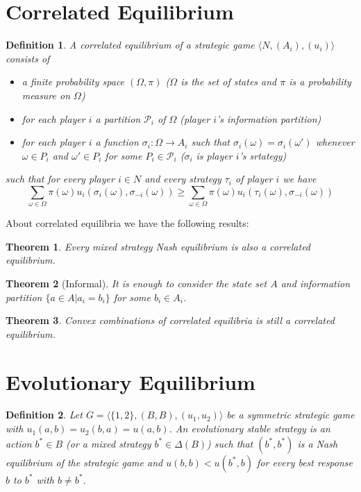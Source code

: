 \documentclass[openany]{book}
\newtheorem{definition}{Definition}[chapter]
\newtheorem{theorem}{Theorem}[chapter]
\begin{document}
\section{Correlated Equilibrium}
\begin{definition}
A correlated equilibrium of a strategic game $\langle N,(A_i),(u_i)\rangle$ consists of
\begin{itemize}
\item a finite probability space $(\Omega, \pi)$ ($\Omega$ is the set of states and $\pi$ is a probability measure on $\Omega$)
\item for each player $i$ a partition $\mathcal{P}_i$ of $\Omega$ (player $i$'s information partition)
\item for each player $i$ a function $\sigma_i:\Omega\rightarrow A_i$ such that $\sigma_i(\omega)=\sigma_i(\omega')$ whenever $\omega\in P_i$ and $\omega'\in P_i$ for some $P_i\in\mathcal{P}_i$ ($\sigma_i$ is player $i$'s srtategy)
\end{itemize}
such that for every player $i\in N$ and every strategy $\tau_i$ of player $i$ we have
\begin{equation}
\sum_{\omega\in\Omega}\pi(\omega)u_i(\sigma_i(\omega),\sigma_{-i}(\omega))\ge\sum_{\omega\in\Omega}\pi(\omega)u_i(\tau_i(\omega),\sigma_{-i}(\omega))
\end{equation}
\end{definition}

About correlated equilibria we have the following results:
\begin{theorem}
Every mixed strategy  Nash equilibrium is also a correlated equilibrium.
\end{theorem}

\begin{theorem}[Informal]
It is enough to consider the state set $A$ and information partition $\{a\in A|a_i=b_i\}$ for some $b_i\in A_i$.
\end{theorem}

\begin{theorem}
Convex combinations of correlated equilibria is still a correlated equilibrium.
\end{theorem}

\section{Evolutionary Equilibrium}
\begin{definition}
Let $G=\langle\{1,2\},(B,B),(u_1,u_2)\rangle$ be a symmetric strategic game with $u_1(a,b)=u_2(b,a)=u(a,b)$. An evolutionary stable strategy is an action $b^*\in B$ (or a mixed strategy $b^*\in\Delta(B)$) such that $(b^*,b^*)$ is a Nash equilibrium of the strategic game and $u(b,b)<u(b^*,b)$ for every best response $b$ to $b^*$ with $b\ne b^*$.
\end{definition}
\end{document}
